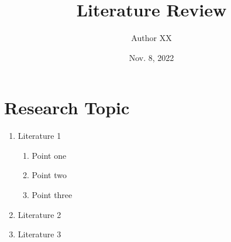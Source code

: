 \documentclass[11pt]{article}
\title{Literature Review}
\author{Author XX}
\date{Nov. 8, 2022}
\begin{document}
\maketitle



\section*{Research Topic}

\begin{enumerate}%
  \item Literature 1
  \begin{enumerate}
    \item Point one
    \item Point two
    \item Point three
  \end{enumerate}
  \item Literature 2
  \item Literature 3
\end{enumerate}
\end{document}
